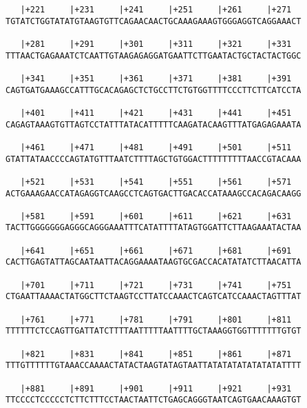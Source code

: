 \documentclass{article}
\begin{document}
\begin{Verbatim}
   |+221     |+231     |+241     |+251     |+261     |+271  
TGTATCTGGTATATGTAAGTGTTCAGAACAACTGCAAAGAAAGTGGGAGGTCAGGAAACT
                                                            
   |+281     |+291     |+301     |+311     |+321     |+331  
TTTAACTGAGAAATCTCAATTGTAAGAGAGGATGAATTCTTGAATACTGCTACTACTGGC
                                                            
   |+341     |+351     |+361     |+371     |+381     |+391  
CAGTGATGAAAGCCATTTGCACAGAGCTCTGCCTTCTGTGGTTTTCCCTTCTTCATCCTA
                                                            
   |+401     |+411     |+421     |+431     |+441     |+451  
CAGAGTAAAGTGTTAGTCCTATTTATACATTTTTCAAGATACAAGTTTATGAGAGAAATA
                                                            
   |+461     |+471     |+481     |+491     |+501     |+511  
GTATTATAACCCCAGTATGTTTAATCTTTTAGCTGTGGACTTTTTTTTTAACCGTACAAA
                                                            
   |+521     |+531     |+541     |+551     |+561     |+571  
ACTGAAAGAACCATAGAGGTCAAGCCTCAGTGACTTGACACCATAAAGCCACAGACAAGG
                                                            
   |+581     |+591     |+601     |+611     |+621     |+631  
TACTTGGGGGGGAGGGCAGGGAAATTTCATATTTTATAGTGGATTCTTAAGAAATACTAA
                                                            
   |+641     |+651     |+661     |+671     |+681     |+691  
CACTTGAGTATTAGCAATAATTACAGGAAAATAAGTGCGACCACATATATCTTAACATTA
                                                            
   |+701     |+711     |+721     |+731     |+741     |+751  
CTGAATTAAAACTATGGCTTCTAAGTCCTTATCCAAACTCAGTCATCCAAACTAGTTTAT
                                                            
   |+761     |+771     |+781     |+791     |+801     |+811  
TTTTTTCTCCAGTTGATTATCTTTTAATTTTTAATTTTGCTAAAGGTGGTTTTTTTGTGT
                                                            
   |+821     |+831     |+841     |+851     |+861     |+871  
TTTGTTTTTTGTAAACCAAAACTATACTAAGTATAGTAATTATATATATATATATATTTT
                                                            
   |+881     |+891     |+901     |+911     |+921     |+931  
TTCCCCTCCCCCTCTTCTTTCCTAACTAATTCTGAGCAGGGTAATCAGTGAACAAAGTGT
                                                            

\end{Verbatim}
\end{document}
